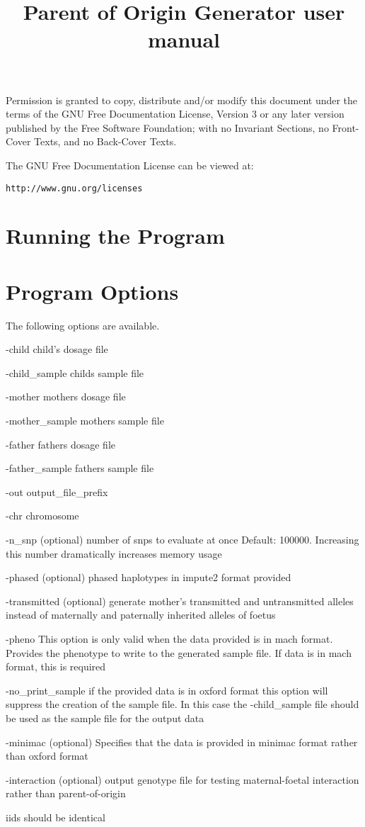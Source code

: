 \documentclass[a4paper,11pt]{article}
\begin{document}
\title{Parent of Origin Generator user manual}
\maketitle

\noindent
Permission is granted to copy, distribute and/or modify this document under the terms of the GNU Free Documentation License, Version 3 or any later version published by the Free Software Foundation; with no Invariant Sections, no Front-Cover Texts, and no Back-Cover Texts.

The GNU Free Documentation License can be viewed at:
\begin{verbatim}
http://www.gnu.org/licenses
\end{verbatim}

\newpage

\section{Running the Program}



\section{Program Options}

The following options are available.

	-child           child's dosage file

	-child\_sample    childs sample file

	-mother          mothers dosage file

	-mother\_sample   mothers sample file

	-father          fathers dosage file

	-father\_sample   fathers sample file

	-out             output\_file\_prefix

	-chr             chromosome

	-n\_snp           (optional) number of snps to evaluate at once Default: 100000. Increasing this number dramatically increases memory usage

	-phased          (optional) phased haplotypes in impute2 format provided

	-transmitted     (optional) generate mother's transmitted and untransmitted alleles instead of maternally and paternally inherited alleles of foetus

	-pheno           This option is only valid when the data provided is in mach format. Provides the phenotype to write to the generated sample file. If data is in mach format, this is required

        -no\_print\_sample if the provided data is in oxford format this option will suppress the creation of the sample file. In this case the -child\_sample file should be used as the sample file for the output data

        -minimac         (optional) Specifies that the data is provided in minimac format rather than oxford format

        -interaction     (optional) output genotype file for testing maternal-foetal interaction rather than parent-of-origin

iids should be identical
\end{document}
